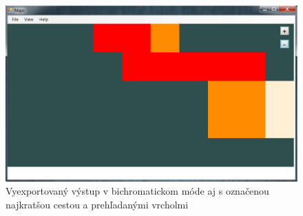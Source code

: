\begin{figure}[h]
\centering
\includegraphics[width=12cm]{./img/testmap_program_bichromatic_w_path.png}
\caption{Vyexportovaný výstup v bichromatickom móde aj s označenou najkratšou cestou a prehľadanými vrcholmi}
\label{fig:testmap_bichromatic_w_path}
\end{figure}
